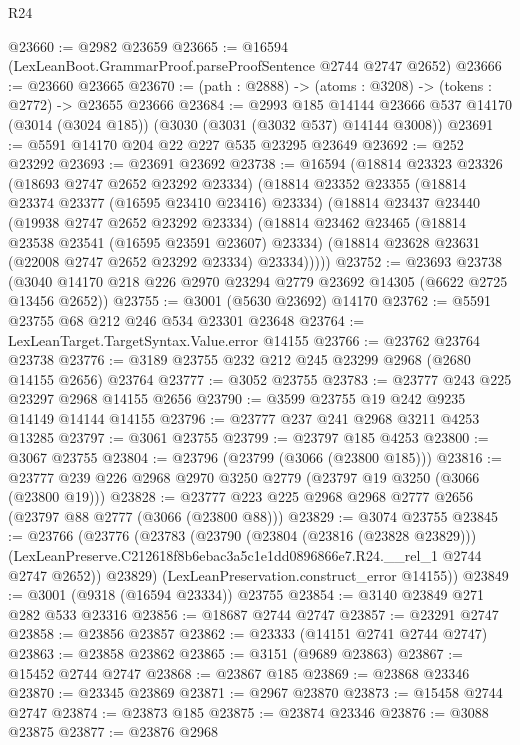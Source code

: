 \begin{lexlean}{R24}
\begin{coremodule}
@23660 := @2982 @23659
@23665 := @16594 (LexLeanBoot.GrammarProof.parseProofSentence @2744 @2747 @2652)
@23666 := @23660 @23665
@23670 := (path : @2888) -> (atoms : @3208) -> (tokens : @2772) -> @23655 @23666
@23684 := @2993
    @185
    @14144
    @23666
    @537
    @14170
    (@3014 (@3024 @185))
    (@3030 (@3031 (@3032 @537) @14144 @3008))
@23691 := @5591 @14170 @204 @22 @227 @535 @23295 @23649
@23692 := @252 @23292
@23693 := @23691 @23692
@23738 := @16594
    (@18814
      @23323
      @23326
      (@18693 @2747 @2652 @23292 @23334)
      (@18814
        @23352
        @23355
        (@18814 @23374 @23377 (@16595 @23410 @23416) @23334)
        (@18814
          @23437
          @23440
          (@19938 @2747 @2652 @23292 @23334)
          (@18814
            @23462
            @23465
            (@18814 @23538 @23541 (@16595 @23591 @23607) @23334)
            (@18814 @23628 @23631 (@22008 @2747 @2652 @23292 @23334) @23334)))))
@23752 := @23693
    @23738
    (@3040 @14170 @218 @226 @2970 @23294 @2779 @23692 @14305 (@6622 @2725 @13456 @2652))
@23755 := @3001 (@5630 @23692) @14170
@23762 := @5591 @23755 @68 @212 @246 @534 @23301 @23648
@23764 := LexLeanTarget.TargetSyntax.Value.error @14155
@23766 := @23762 @23764 @23738
@23776 := @3189 @23755 @232 @212 @245 @23299 @2968 (@2680 @14155 @2656) @23764
@23777 := @3052 @23755
@23783 := @23777 @243 @225 @23297 @2968 @14155 @2656
@23790 := @3599 @23755 @19 @242 @9235 @14149 @14144 @14155
@23796 := @23777 @237 @241 @2968 @3211 @4253 @13285
@23797 := @3061 @23755
@23799 := @23797 @185 @4253
@23800 := @3067 @23755
@23804 := @23796 (@23799 (@3066 (@23800 @185)))
@23816 := @23777 @239 @226 @2968 @2970 @3250 @2779 (@23797 @19 @3250 (@3066 (@23800 @19)))
@23828 := @23777 @223 @225 @2968 @2968 @2777 @2656 (@23797 @88 @2777 (@3066 (@23800 @88)))
@23829 := @3074 @23755
@23845 := @23766
    (@23776
      (@23783
        (@23790
          (@23804 (@23816 (@23828 @23829)))
          (LexLeanPreserve.C212618f8b6ebac3a5c1e1dd0896866e7.R24.__rel_1 @2744 @2747 @2652))
        @23829)
      (LexLeanPreservation.construct_error @14155))
@23849 := @3001 (@9318 (@16594 @23334)) @23755
@23854 := @3140 @23849 @271 @282 @533 @23316
@23856 := @18687 @2744 @2747
@23857 := @23291 @2747
@23858 := @23856 @23857
@23862 := @23333 (@14151 @2741 @2744 @2747)
@23863 := @23858 @23862
@23865 := @3151 (@9689 @23863)
@23867 := @15452 @2744 @2747
@23868 := @23867 @185
@23869 := @23868 @23346
@23870 := @23345 @23869
@23871 := @2967 @23870
@23873 := @15458 @2744 @2747
@23874 := @23873 @185
@23875 := @23874 @23346
@23876 := @3088 @23875
@23877 := @23876 @2968

\end{coremodule}
\end{lexlean}
